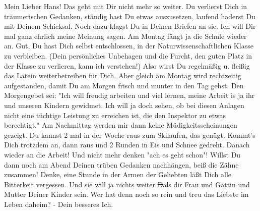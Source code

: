 \def\day{8. Januar 1944}
\mktitle

Mein Lieber Hans!
Das geht mit Dir nicht mehr so weiter.
Du verlierst Dich in tr\"{a}umerischen Gedanken, st\"{a}ndig hast Du etwas auszusetzen, laufend haderst Du mit Deinem Schicksal.
Noch dazu klagst Du in Deinen Briefen an sie.
Ich will Dir mal ganz ehrlich meine Meinung sagen.
Am Montag f\"{a}ngt ja die Schule wieder an.
Gut, Du hast Dich selbst entschlossen, in der Naturwissenschaftlichen Klasse zu verbleiben.
(Dein pers\"{o}nliches Unbehagen und die Furcht, den guten Platz in der Klasse zu verlieren, kann ich verstehen!)
Also wirst Du regelm\"{a}{\ss}ig u. flei{\ss}ig das Latein weiterbetreiben f\"{u}r Dich.
Aber gleich am Montag wird rechtzeitig aufgestanden, damit Du am Morgen frisch und munter in den Tag gehst.
Den Morgengebet sei: "Ich will freudig arbeiten und viel lernen, meine Arbeit is ja ihr und unseren Kindern gewidmet.
Ich will ja doch sehen, ob bei diesen Anlagen nicht eine t\"{u}chtige Leistung zu erreichen ist, die den Inspektor zu etwas berechtigt."
Am Nachmittag werden mir dann keine M\"{u}digkeitsscheinungen gezeigt.
Du kannst 2 mal in der Woche raus zum Skilaufen, das gen\"{u}gt.
Kommt's Dich trotzdem an, dann raus und 2 Runden in Eis und Schnee gedreht.
Danach wieder an die Arbeit!
Und nicht mehr denken "ach es geht schon"!
Willst Du dann noch am Abend Deinen tr\"{u}ben Gedanken nachh\"{a}ngen, bei{\ss} die Z\"{a}hne zusammen!
Denke, eine Stunde in der Armen der Geliebten l\"{a}{\ss}t Dich alle Bitterkeit vergessen.
Und sie will ja nichts weiter \st{D}als dir Frau und Gattin und Mutter Deiner Kinder sein.
Wer hat denn noch so rein und treu das Liebste im Leben daheim?
- Dein besseres Ich.

\clearpage

